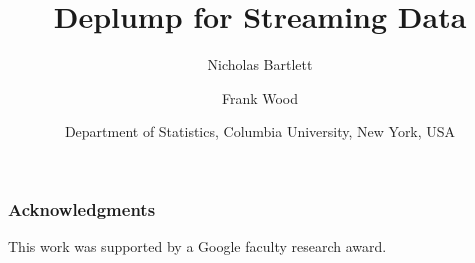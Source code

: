 \documentclass[oneside,letterpaper,12pt]{article}
\title{Deplump for Streaming Data}
\author{Nicholas Bartlett  \and Frank Wood}
\date{
\small Department of Statistics, Columbia University, New York, USA}
\begin{document}
\maketitle









%

%

%

%

%

\subsubsection*{Acknowledgments}
This work was supported by a Google faculty research award.

\renewcommand{\bibsection}{\subsubsection*{References}}
\setlength{\bibsep}{0mm}

\end{document}
